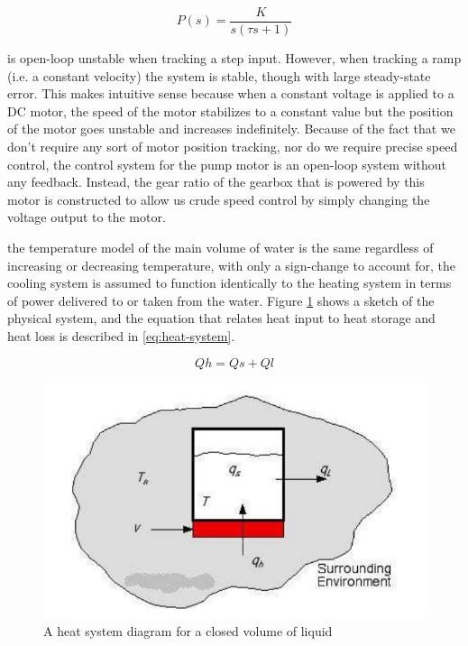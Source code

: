 \documentclass{article}
\begin{document}
\begin{equation}
P(s) = \frac{K}{s(\tau s + 1)}
\label{eq:gear-angle}
\end{equation}

 is open-loop unstable when tracking a step input. However, when tracking a ramp (i.e. a constant velocity) the system is stable, though with large steady-state error. This makes intuitive sense because when a constant voltage is applied to a DC motor, the speed of the motor stabilizes to a constant value but the position of the motor goes unstable and increases indefinitely. Because of the fact that we don't require any sort of motor position tracking, nor do we require precise speed control, the control system for the pump motor is an open-loop system without any feedback. Instead, the gear ratio of the gearbox that is powered by this motor is constructed to allow us crude speed control by simply changing the voltage output to the motor.

 the temperature model of the main volume of water is the same regardless of increasing or decreasing temperature, with only a sign-change to account for, the cooling system is assumed to function identically to the heating system in terms of power delivered to or taken from the water. Figure \ref{fig:heat-system-diagram} shows a sketch of the physical system, and the equation that relates heat input to heat storage and heat loss is described in \ref{eq:heat-system}.

\begin{equation}
Qh = Qs + Ql
\label{eq:heat-system}
\end{equation}

\begin{figure}[H]
\begin{center}
\includegraphics[scale=0.30]{heat-system-diagram.png}
\caption{A heat system diagram for a closed volume of liquid}
\label{fig:heat-system-diagram}
\end{center}
\end{figure}
\end{document}
